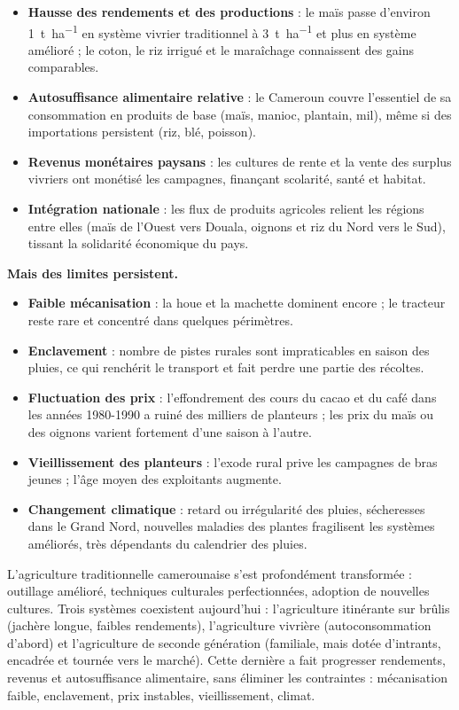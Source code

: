 \documentclass[11pt]{article}
\begin{document}
\begin{itemize}
\item \textbf{Hausse des rendements et des productions} : le maïs passe d'environ \SI{1}{\tonne\per\hectare} en système vivrier traditionnel à \SI{3}{\tonne\per\hectare} et plus en système amélioré ; le coton, le riz irrigué et le maraîchage connaissent des gains comparables.
\item \textbf{Autosuffisance alimentaire relative} : le Cameroun couvre l'essentiel de sa consommation en produits de base (maïs, manioc, plantain, mil), même si des importations persistent (riz, blé, poisson).
\item \textbf{Revenus monétaires paysans} : les cultures de rente et la vente des surplus vivriers ont monétisé les campagnes, finançant scolarité, santé et habitat.
\item \textbf{Intégration nationale} : les flux de produits agricoles relient les régions entre elles (maïs de l'Ouest vers Douala, oignons et riz du Nord vers le Sud), tissant la solidarité économique du pays.
\end{itemize}

\textbf{Mais des limites persistent.}

\begin{itemize}
\item \textbf{Faible mécanisation} : la houe et la machette dominent encore ; le tracteur reste rare et concentré dans quelques périmètres.
\item \textbf{Enclavement} : nombre de pistes rurales sont impraticables en saison des pluies, ce qui renchérit le transport et fait perdre une partie des récoltes.
\item \textbf{Fluctuation des prix} : l'effondrement des cours du cacao et du café dans les années 1980-1990 a ruiné des milliers de planteurs ; les prix du maïs ou des oignons varient fortement d'une saison à l'autre.
\item \textbf{Vieillissement des planteurs} : l'exode rural prive les campagnes de bras jeunes ; l'âge moyen des exploitants augmente.
\item \textbf{Changement climatique} : retard ou irrégularité des pluies, sécheresses dans le Grand Nord, nouvelles maladies des plantes fragilisent les systèmes améliorés, très dépendants du calendrier des pluies.
\end{itemize}

\begin{aretenir}
L'agriculture traditionnelle camerounaise s'est profondément transformée : outillage amélioré, techniques culturales perfectionnées, adoption de nouvelles cultures. Trois systèmes coexistent aujourd'hui : l'agriculture itinérante sur brûlis (jachère longue, faibles rendements), l'agriculture vivrière (autoconsommation d'abord) et l'agriculture de seconde génération (familiale, mais dotée d'intrants, encadrée et tournée vers le marché). Cette dernière a fait progresser rendements, revenus et autosuffisance alimentaire, sans éliminer les contraintes : mécanisation faible, enclavement, prix instables, vieillissement, climat.
\end{aretenir}
\end{document}
